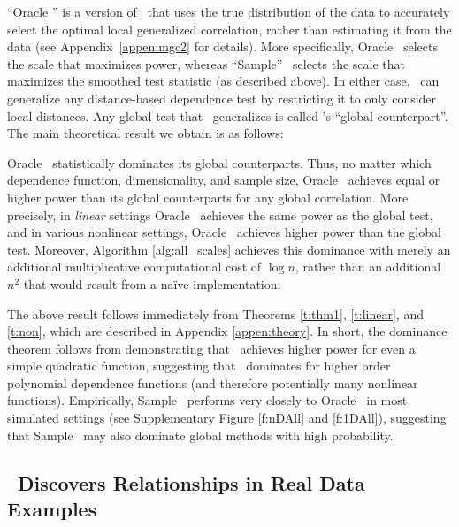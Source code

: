 \documentclass[11pt]{article}
\begin{document}
``Oracle \Mgc'' is a version of \Mgc~that uses the true distribution of the data to accurately select the optimal local generalized correlation, rather than estimating it from the data (see Appendix~\ref{appen:mgc2} for details). More specifically, Oracle \Mgc~selects the scale that maximizes power, whereas ``Sample'' \Mgc~selects the scale that maximizes the smoothed test statistic (as described above). 
In either case,  \Mgc~can generalize any distance-based dependence test by restricting it to only consider local distances.  Any global test that \Mgc~generalizes is called \Mgc's ``global counterpart''.  The main theoretical result we obtain is as follows:
% 
\begin{thm} \label{t:dominate}
Oracle \Mgc~statistically dominates its global counterparts. Thus, no matter which 
dependence function, dimensionality, and sample size, 
Oracle \Mgc~achieves equal or higher power than its global counterparts for any global correlation.  More precisely, in \emph{linear} settings Oracle \Mgc~achieves the same power as the global test, and in various nonlinear settings, Oracle \Mgc~achieves {higher} power than the global test. Moreover, Algorithm \ref{alg:all_scales} achieves this dominance with merely an additional multiplicative computational cost of $\log n$, rather than an additional $n^2$ that would result from a na\"ive implementation.
\end{thm}

The above result follows immediately from Theorems \ref{t:thm1}, \ref{t:linear}, and \ref{t:non}, which are described in Appendix \ref{appen:theory}. In short, the dominance theorem follows from demonstrating that \Mgc~achieves higher power for even a simple quadratic function, suggesting that \Mgc~dominates for higher order polynomial dependence functions (and therefore potentially many nonlinear functions).
Empirically, Sample \Mgc~performs very closely to Oracle \Mgc~in most simulated settings (see Supplementary Figure \ref{f:nDAll} and \ref{f:1DAll}), suggesting that Sample \Mgc~may also dominate global methods with high probability.

\subsection*{\Mgc~Discovers  Relationships in Real Data Examples}
\label{numer3}
\end{document}

